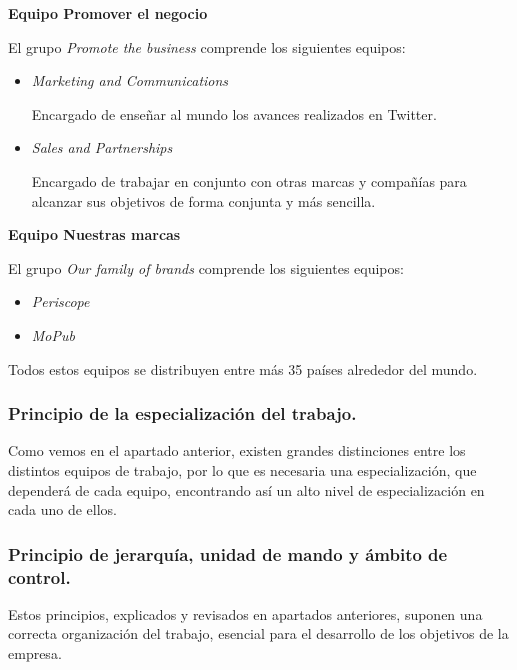 \textbf{Equipo Promover el negocio}

El grupo \textit{Promote the business} comprende los siguientes equipos:

\begin{itemize}

\item \textit{Marketing and Communications}

Encargado de enseñar al mundo los avances realizados en Twitter.

\item \textit{Sales and Partnerships}

Encargado de trabajar en conjunto con otras marcas y compañías para alcanzar sus objetivos de forma conjunta y más sencilla.

\end{itemize}

\textbf{Equipo Nuestras marcas}

El grupo \textit{Our family of brands} comprende los siguientes equipos:

\begin{itemize}

\item \textit{Periscope}
\item \textit{MoPub}\\

\end{itemize}



Todos estos equipos se distribuyen entre más 35 países alrededor del mundo.

\subsubsection{Principio de la especialización del trabajo.}

Como vemos en el apartado anterior, existen grandes distinciones entre los distintos equipos de trabajo, por lo que es necesaria una especialización, que dependerá de cada equipo, encontrando así un alto nivel de especialización en cada uno de ellos.

\subsubsection{Principio de jerarquía, unidad de mando y ámbito de control.}

Estos principios, explicados y revisados en apartados anteriores, suponen una correcta organización del trabajo, esencial para el desarrollo de los objetivos de la empresa.

